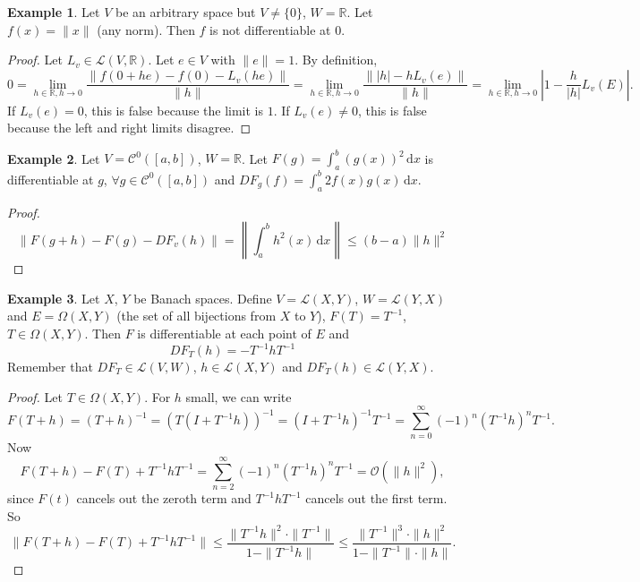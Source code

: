 \documentclass[12pt]{article}
\theoremstyle{plain}
\theoremstyle{definition}
\newtheorem*{eg}{Example}
\begin{document}
\begin{eg}
    Let $V$ be an arbitrary space but $V\neq \{0\}$, $W=\mathbb{R}$.
    Let $f(x) = \|x\|$ (any norm).
    Then $f$ is not differentiable at $0$.
\end{eg}
\begin{proof}
    Let $L_v\in\mathcal{L}(V,\mathbb{R})$.
    Let $e\in V$ with $\|e\|=1$.
    By definition,
    \[
        0=\lim_{h\in\mathbb{R}, h\rightarrow0}\frac{\left\|f(0+he)-f(0)-L_v(he)\right\|}{\|h\|}
        =\lim_{h\in\mathbb{R}, h\rightarrow0}\frac{\left\| |h|-hL_v(e)\right\|}{\|h\|}
        =\lim_{h\in\mathbb{R}, h\rightarrow0}\left|1-\frac{h}{|h|}L_v(E)\right|.
    \]
    If $L_v(e)=0$, this is false because the limit is $1$.
    If $L_v(e)\neq 0$, this is false because the left and right limits disagree.
\end{proof}

\begin{eg}
    Let $V=\mathcal{C}^0([a,b])$, $W=\mathbb{R}$.
    Let $F(g) = \int_a^b (g(x))^2\,\mathrm{d}x$ is differentiable at $g$, $\forall g\in \mathcal{C}^0([a,b])$ and
    $DF_g(f)=\int_a^b2f(x)g(x)\,\mathrm{d}x$.
\end{eg}
\begin{proof}
    \[
        \|F(g+h)-F(g)-DF_v(h)\| = \left\| \int_a^b h^2(x)\,\mathrm{d}x\right\| \leq (b-a) \|h\|^2
    \]
\end{proof}

\begin{eg}
    Let $X$, $Y$ be Banach spaces.
    Define $V=\mathcal{L}(X,Y)$, $W=\mathcal{L}(Y, X)$ and $E=\Omega(X,Y)$ (the set of all bijections from $X$ to $Y$),
    $F(T) = T^{-1}$, $T\in \Omega(X,Y)$.
    Then $F$ is differentiable at each point of $E$ and
    \[
        DF_T(h) = -T^{-1}hT^{-1}
    \]
    Remember that $DF_T\in\mathcal{L}(V,W)$, $h\in\mathcal{L}(X,Y)$ and $DF_T(h)\in\mathcal{L}(Y,X)$.
\end{eg}
\begin{proof}
    Let $T\in\Omega(X,Y)$.
    For $h$ small, we can write 
    \[
        F(T+h) = (T+h)^{-1} = (T(I+T^{-1}h))^{-1} = (I+T^{-1}h)^{-1}T^{-1} = \sum_{n=0}^\infty (-1)^n(T^{-1}h)^nT^{-1}.
    \]
    Now
    \[
        F(T+h) - F(T) + T^{-1}hT^{-1}
        = \sum_{n=2}^\infty (-1)^n(T^{-1}h)^nT^{-1}
        = \mathcal{O}(\|h\|^2),
    \]
    since $F(t)$ cancels out the zeroth term and $T^{-1}hT^{-1}$ cancels out the first term.
    So
    \[
        \|F(T+h) - F(T) + T^{-1}hT^{-1}\|
        \leq \frac{\|T^{-1}h\|^2\cdot\|T^{-1}\|}{1-\|T^{-1}h\|}
        \leq \frac{\|T^{-1}\|^3\cdot\|h\|^2}{1-\|T^{-1}\|\cdot\|h\|}.
    \]
\end{proof}
\end{document}
